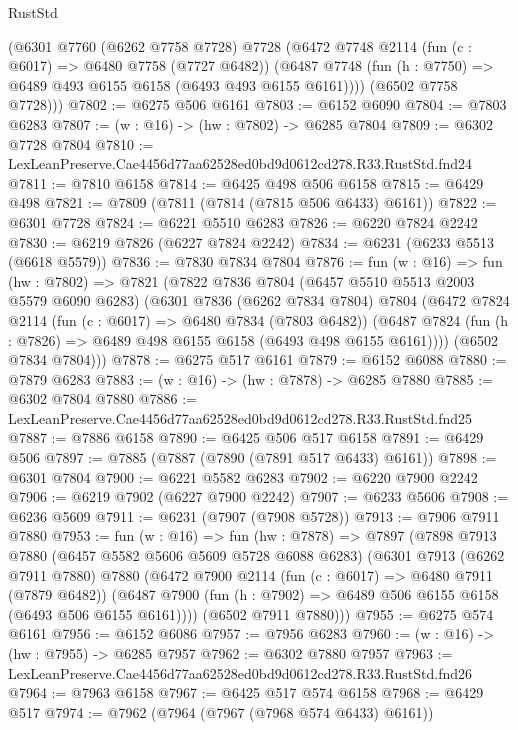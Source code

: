 \begin{lexlean}{RustStd}
\begin{coremodule}
      (@6301
        @7760
        (@6262 @7758 @7728)
        @7728
        (@6472
          @7748
          @2114
          (fun (c : @6017) => @6480 @7758 (@7727 @6482))
          (@6487 @7748 (fun (h : @7750) => @6489 @493 @6155 @6158 (@6493 @493 @6155 @6161))))
        (@6502 @7758 @7728)))
@7802 := @6275 @506 @6161
@7803 := @6152 @6090
@7804 := @7803 @6283
@7807 := (w : @16) -> (hw : @7802) -> @6285 @7804
@7809 := @6302 @7728 @7804
@7810 := LexLeanPreserve.Cae4456d77aa62528ed0bd9d0612cd278.R33.RustStd.fnd24
@7811 := @7810 @6158
@7814 := @6425 @498 @506 @6158
@7815 := @6429 @498
@7821 := @7809 (@7811 (@7814 (@7815 @506 @6433) @6161))
@7822 := @6301 @7728
@7824 := @6221 @5510 @6283
@7826 := @6220 @7824 @2242
@7830 := @6219 @7826 (@6227 @7824 @2242)
@7834 := @6231 (@6233 @5513 (@6618 @5579))
@7836 := @7830 @7834 @7804
@7876 := fun (w : @16) =>
  fun (hw : @7802) =>
  @7821
    (@7822
      @7836
      @7804
      (@6457 @5510 @5513 @2003 @5579 @6090 @6283)
      (@6301
        @7836
        (@6262 @7834 @7804)
        @7804
        (@6472
          @7824
          @2114
          (fun (c : @6017) => @6480 @7834 (@7803 @6482))
          (@6487 @7824 (fun (h : @7826) => @6489 @498 @6155 @6158 (@6493 @498 @6155 @6161))))
        (@6502 @7834 @7804)))
@7878 := @6275 @517 @6161
@7879 := @6152 @6088
@7880 := @7879 @6283
@7883 := (w : @16) -> (hw : @7878) -> @6285 @7880
@7885 := @6302 @7804 @7880
@7886 := LexLeanPreserve.Cae4456d77aa62528ed0bd9d0612cd278.R33.RustStd.fnd25
@7887 := @7886 @6158
@7890 := @6425 @506 @517 @6158
@7891 := @6429 @506
@7897 := @7885 (@7887 (@7890 (@7891 @517 @6433) @6161))
@7898 := @6301 @7804
@7900 := @6221 @5582 @6283
@7902 := @6220 @7900 @2242
@7906 := @6219 @7902 (@6227 @7900 @2242)
@7907 := @6233 @5606
@7908 := @6236 @5609
@7911 := @6231 (@7907 (@7908 @5728))
@7913 := @7906 @7911 @7880
@7953 := fun (w : @16) =>
  fun (hw : @7878) =>
  @7897
    (@7898
      @7913
      @7880
      (@6457 @5582 @5606 @5609 @5728 @6088 @6283)
      (@6301
        @7913
        (@6262 @7911 @7880)
        @7880
        (@6472
          @7900
          @2114
          (fun (c : @6017) => @6480 @7911 (@7879 @6482))
          (@6487 @7900 (fun (h : @7902) => @6489 @506 @6155 @6158 (@6493 @506 @6155 @6161))))
        (@6502 @7911 @7880)))
@7955 := @6275 @574 @6161
@7956 := @6152 @6086
@7957 := @7956 @6283
@7960 := (w : @16) -> (hw : @7955) -> @6285 @7957
@7962 := @6302 @7880 @7957
@7963 := LexLeanPreserve.Cae4456d77aa62528ed0bd9d0612cd278.R33.RustStd.fnd26
@7964 := @7963 @6158
@7967 := @6425 @517 @574 @6158
@7968 := @6429 @517
@7974 := @7962 (@7964 (@7967 (@7968 @574 @6433) @6161))

\end{coremodule}
\end{lexlean}
